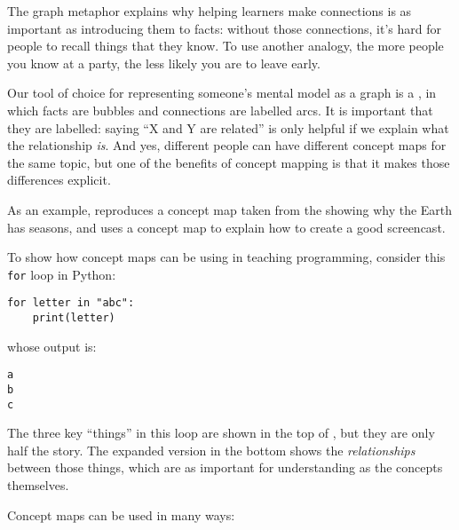 
The graph metaphor explains why helping learners make connections is as
important as introducing them to facts: without those connections, it's
hard for people to recall things that they know. To use another analogy,
the more people you know at a party, the less likely you are to leave
early.

Our tool of choice for representing someone's mental model as a graph is
a , in which facts are bubbles
and connections are labelled arcs. It is important that they are
labelled: saying ``X and Y are related'' is only helpful if we explain
what the relationship \emph{is}. And yes, different people can have different
concept maps for the same topic, but one of the benefits of concept
mapping is that it makes those differences explicit.

As an example,  reproduces a concept map
taken from the  showing why the
Earth has seasons, and  uses a concept
map to explain how to create a good screencast.


To show how concept maps can be using in teaching programming, consider
this \texttt{for} loop in Python:

\begin{verbatim}
for letter in "abc":
    print(letter)
\end{verbatim}

whose output is:

\begin{verbatim}
a
b
c
\end{verbatim}

The three key ``things'' in this loop are shown in the top of
, but they are only half the story. The
expanded version in the bottom shows the \emph{relationships} between those
things, which are as important for understanding as the concepts
themselves.


Concept maps can be used in many ways:

